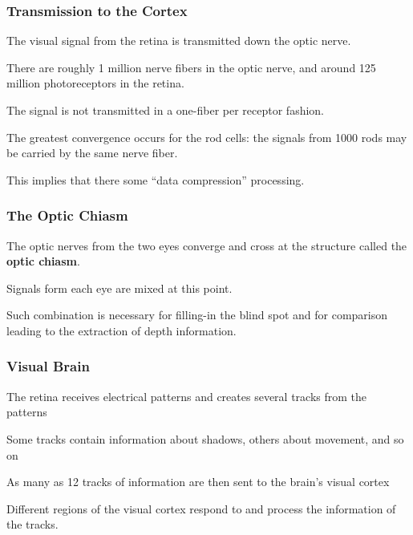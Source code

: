 \documentclass[12pt]{beamer}\usepackage[]{graphicx}\usepackage[]{color}
\begin{document}

\begin{frame}
\frametitle{Transmission to the Cortex}

\bbi
  \item The visual signal from the retina is transmitted down the optic nerve.
  \item There are roughly 1 million nerve fibers in the optic nerve, and around
  125 million photoreceptors in the retina.
  \item The signal is not transmitted in a one-fiber per receptor fashion.
  \item The greatest convergence occurs for the rod cells: the signals from 
  1000 rods may be carried by the same nerve fiber.
  \item This implies that there some ``data compression'' processing.
\ei

\end{frame}


\begin{frame}
\frametitle{The Optic Chiasm}

\bbi
  \item The optic nerves from the two eyes converge and cross at the structure
  called the \textbf{optic chiasm}.
  \item Signals form each eye are mixed at this point.
  \item Such combination is necessary for filling-in the blind spot and for
  comparison leading to the extraction of depth information.
\ei

\end{frame}


\begin{frame}
\frametitle{Visual Brain}

\bbi
  \item The retina receives electrical patterns and creates several tracks 
  from the patterns
  \item Some tracks contain information about shadows, others about movement,
  and so on
  \item As many as 12 tracks of information are then sent to the brain's
  visual cortex
  \item Different regions of the visual cortex respond to and process the
  information of the tracks.
\ei

\end{frame}
\end{document}
